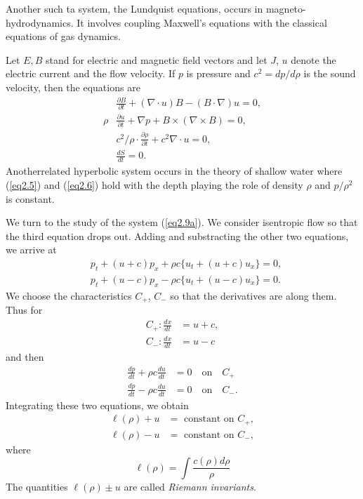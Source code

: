 Another such ta system, the Lundquist equations, occurs in magneto-hydrodynamics. It involves coupling Maxwell's equations with the classical equations of gas dynamics.

Let $E,B$ stand for electric and magnetic field vectors and let $J$, $u$ denote the electric current and the flow velocity. If $p$ is pressure and $c^2 = dp/d\rho$ is the sound velocity, then the equations are
\begin{align*}
& \frac{\partial B}{\partial t} + (\nabla \cdot u) B - (B \cdot \nabla) u = 0, \\
\rho & \frac{\partial u}{\partial t} + \nabla p + B \times (\nabla \times B) = 0,\\
& c^2 / \rho \cdot \frac{\partial \rho }{\partial t} + c^2 \nabla \cdot u = 0,\\
& \frac{dS}{dt} = 0.
\end{align*}
Another\pageoriginale related hyperbolic system occurs in the theory of shallow water where (\ref{eq2.5}) and (\ref{eq2.6}) hold  with the depth playing the role of density $\rho$ and $p/\rho^2$ is constant.

We turn to the study of the system (\ref{eq2.9a}). We consider isentropic flow so that the third equation drops out. Adding and substracting the other two equations, we arrive at
\begin{align*}
& p_t + (u+c) p_x + \rho c \{u_t + (u+c) u_x\} =0,\\
& p_t + (u-c)p_x - \rho c \{u_t + (u-c) u_x\} = 0.
\end{align*}
We choose the characteristics $C_+$, $C_-$ so that the derivatives are along them. Thus for 
\begin{align*}
 C_+ : \frac{dx}{dt} & = u + c, \\
 C_- : \frac{dx}{dt} & = u - c
\end{align*}
and then
\begin{align*}
\frac{dp}{dt} + \rho c \frac{du}{dt} & = 0 \quad \text{on} \quad C_+\\
\frac{dp}{dt} - \rho c \frac{du}{dt} & = 0 \quad \text{on} \quad C_-.
\end{align*}
Integrating these two equations, we obtain
\begin{align*}
 \ell (\rho) + u & = \text{ constant on } C_+,\\
 \ell (\rho) - u & = \text{ constant on } C_-,
\end{align*} 
where 
$$
\ell (\rho) = \int \frac{c(\rho) d\rho}{\rho}
$$
The quantities $\ell (\rho) \pm u$ are called {\em Riemann invariants}.

